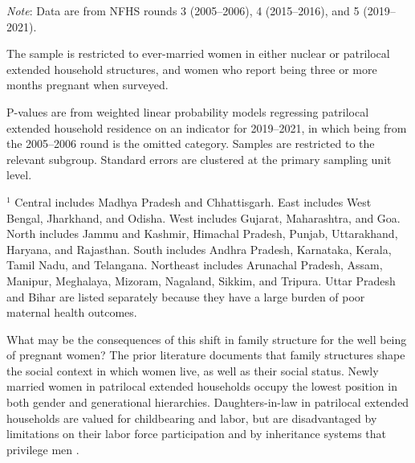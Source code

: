 \documentclass[10pt,twoside,reqno]{article}
\begin{document}
\begin{scriptsize}
\setlength{\tabcolsep}{6pt}
\renewcommand{\arraystretch}{1.2}

\label{tab:patrilocal_subgroups}

\vspace{-4pt}

\begingroup

\setlength\LTleft{\fill}
\setlength\LTright{\fill}

\let\tabular\longtable
\let\endtabular\endlongtable



\endgroup

\vspace{1ex}

\textsf{\textit{Note}: Data are from NFHS rounds 3 (2005--2006),
4 (2015--2016), and 5 (2019--2021).}

\textsf{The sample is restricted to ever-married women in either nuclear
or patrilocal extended household structures, and women who report being
three or more months pregnant when surveyed.}

\textsf{P-values are from weighted linear probability models regressing
patrilocal extended household residence on an indicator for 2019--2021,
in which being from the 2005--2006 round is the omitted category.
Samples are restricted to the relevant subgroup. Standard errors are
clustered at the primary sampling unit level.}

\textsf{$^1$ Central includes Madhya Pradesh and Chhattisgarh. East
includes West Bengal, Jharkhand, and Odisha. West includes Gujarat,
Maharashtra, and Goa. North includes Jammu and Kashmir, Himachal Pradesh,
Punjab, Uttarakhand, Haryana, and Rajasthan. South includes Andhra Pradesh,
Karnataka, Kerala, Tamil Nadu, and Telangana. Northeast includes Arunachal
Pradesh, Assam, Manipur, Meghalaya, Mizoram, Nagaland, Sikkim, and Tripura.
Uttar Pradesh and Bihar are listed separately because they have a large
burden of poor maternal health outcomes.}

\end{scriptsize}

\vspace{1.5\baselineskip}


What may be the consequences of this shift in family structure for the well being of pregnant women? The prior literature documents that family structures shape the social context in which women live, as well as their social status. Newly married women in patrilocal extended households occupy the lowest position in both gender and generational hierarchies. Daughters-in-law in patrilocal extended households are valued for childbearing and labor, but are disadvantaged by limitations on their labor force participation and by inheritance systems that privilege men \citep{afridi2018fewer, mookerjee2019gender, reed2020labor, chatterjee2022women}.  
\end{document}
